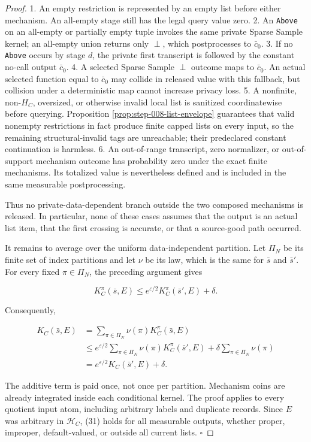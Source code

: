 \begin{proof}
1. An empty restriction is represented by an empty list before either
   mechanism. An all-empty stage still has the legal query value zero.
2. An \texttt{Above} on an all-empty or partially empty tuple invokes the same
   private Sparse Sample kernel; an all-empty union returns only \(\perp\),
   which postprocesses to \(\bar c_0\).
3. If no \texttt{Above} occurs by stage \(d\), the private first transcript is
   followed by the constant no-call output \(\bar c_0\).
4. A selected Sparse Sample \(\perp\) outcome maps to \(\bar c_0\). An
   actual selected function equal to \(\bar c_0\) may collide in released
   value with this fallback, but collision under a deterministic map cannot
   increase privacy loss.
5. A nonfinite, non-\(H_C\), oversized, or otherwise invalid local list is
   sanitized coordinatewise before querying. Proposition
   \ref{prop:step-008-list-envelope} guarantees
   that valid nonempty restrictions in fact produce finite capped lists on
   every input, so the remaining structural-invalid tags are unreachable;
   their predeclared constant continuation is harmless.
6. An out-of-range transcript, zero normalizer, or out-of-support mechanism
   outcome has probability zero under the exact finite mechanisms. Its
   totalized value is nevertheless defined and is included in the same
   measurable postprocessing.

Thus no private-data-dependent branch outside the two composed mechanisms
is released. In particular, none of these cases assumes that the output
is an actual list item, that the first crossing is accurate, or that a
source-good path occurred.

It remains to average over the uniform data-independent partition. Let
\(\Pi_N\) be its finite set of index partitions and let \(\nu\) be its law,
which is the same for \(\bar s\) and \(\bar s'\). For every fixed
\(\pi\in\Pi_N\), the preceding argument gives

\[
 K_C^{\pi}(\bar s,E)
 \leq e^{\varepsilon/2}K_C^{\pi}(\bar s',E)+\delta.
\tag{34}
\]

Consequently,

\[
\begin{aligned}
 K_C(\bar s,E)
 &=\sum_{\pi\in\Pi_N}\nu(\pi)K_C^{\pi}(\bar s,E)\\
 &\leq e^{\varepsilon/2}
       \sum_{\pi\in\Pi_N}\nu(\pi)K_C^{\pi}(\bar s',E)
       +\delta\sum_{\pi\in\Pi_N}\nu(\pi)\\
 &=e^{\varepsilon/2}K_C(\bar s',E)+\delta.
\end{aligned}
\tag{35}
\]

The additive term is paid once, not once per partition. Mechanism coins are
already integrated inside each conditional kernel. The proof applies to
every quotient input atom, including arbitrary labels and duplicate
records. Since \(E\) was arbitrary in \(\mathcal H_C\), (31) holds for all
measurable outputs, whether proper, improper, default-valued, or outside all
current lists. \(\square\)


\end{proof}

